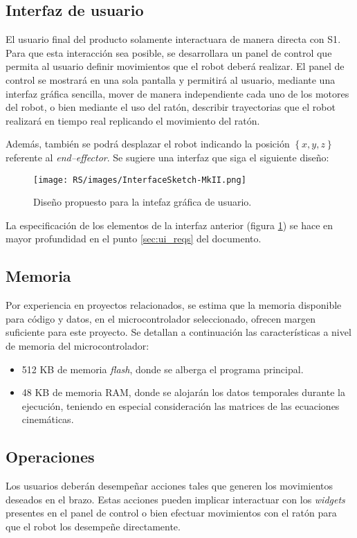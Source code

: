 \subsection{Interfaz de usuario}

El usuario final del producto solamente interactuara de manera directa con \ac{S1}.
Para que esta interacción sea posible, se desarrollara un panel de control que permita al usuario definir movimientos que el robot deberá realizar. El panel de control se mostrará en una sola pantalla y permitirá al usuario, mediante una interfaz gráfica sencilla, mover de manera independiente cada uno de los motores del robot, o bien mediante el uso del ratón, describir trayectorias que el robot realizará en tiempo real replicando el movimiento del ratón.

Además, también se podrá desplazar el robot indicando la posición $\left\{x, y, z\right\}$ referente al \textit{end--effector}. Se sugiere una interfaz que siga el siguiente diseño:

\begin{figure}[H]
    \centering
    \texttt{[image: RS/images/InterfaceSketch-MkII.png]}
    \caption{Diseño propuesto para la intefaz gráfica de usuario.}
    \label{fig:ui_design}
\end{figure}

La especificación de los elementos de la interfaz anterior (figura \ref{fig:ui_design}) se hace en mayor profundidad en el punto \ref{sec:ui_reqs} del documento.

\subsection{Memoria}

Por experiencia en proyectos relacionados, se estima que la memoria disponible para 
código y datos, en el microcontrolador seleccionado, ofrecen margen suficiente para este
proyecto. Se detallan a continuación las características a nivel de memoria del
microcontrolador:

\begin{itemize}
    \item 512 KB de memoria \textit{flash}, donde se alberga el programa principal.
    \item 48 KB de memoria \ac{RAM}, donde se alojarán los datos temporales durante la ejecución, teniendo en especial consideración las matrices de las ecuaciones cinemáticas.
\end{itemize}

\subsection{Operaciones}

Los usuarios deberán desempeñar acciones tales que generen los movimientos deseados en el brazo. Estas acciones pueden implicar interactuar con los \textit{widgets} presentes en el panel de control o bien efectuar movimientos con el ratón para que el robot los desempeñe directamente.
